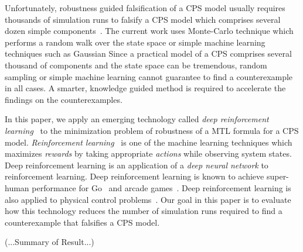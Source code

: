 Unfortunately, robustness guided falsification of a CPS model usually requires thousands of simulation runs to falsify a CPS model \DIFdelbegin \DIFdel{, }\DIFdelend which comprises several dozen simple components~\cite{}.
The current work uses Monte-Carlo technique which performs a random walk over the state space or simple machine learning techniques such as Gaussian \DIFdelbegin {}\DIFdelend \DIFaddbegin {}
\DIFaddend Since a practical model of a CPS comprises several thousand of components and the state space can be tremendous, random sampling or simple machine learning cannot guarantee to find a counterexample in all cases.
A smarter, knowledge guided method is required to accelerate the findings on the counterexamples.
\DIFaddbegin {}
\DIFaddend 

In this paper, we apply an emerging technology called \emph{deep reinforcement learning}~\cite{} to the minimization problem of robustness of a MTL formula for a CPS model.
\emph{Reinforcement learning}~\cite{} is one of the machine learning techniques which maximizes \emph{rewards} by taking appropriate \emph{actions} while observing system states.
Deep reinforcement learning is an application of a \emph{deep neural network} to reinforcement learning.
Deep reinforcement learning is known to achieve super-human performance for Go~\cite{} and arcade games~\cite{}.
Deep reinforcement learning is also applied to physical control problems~\cite{}.
Our goal in this paper is to evaluate how this technology reduces the number of simulation runs required to find a counterexample that falsifies a CPS model.

(...Summary of Result...)
